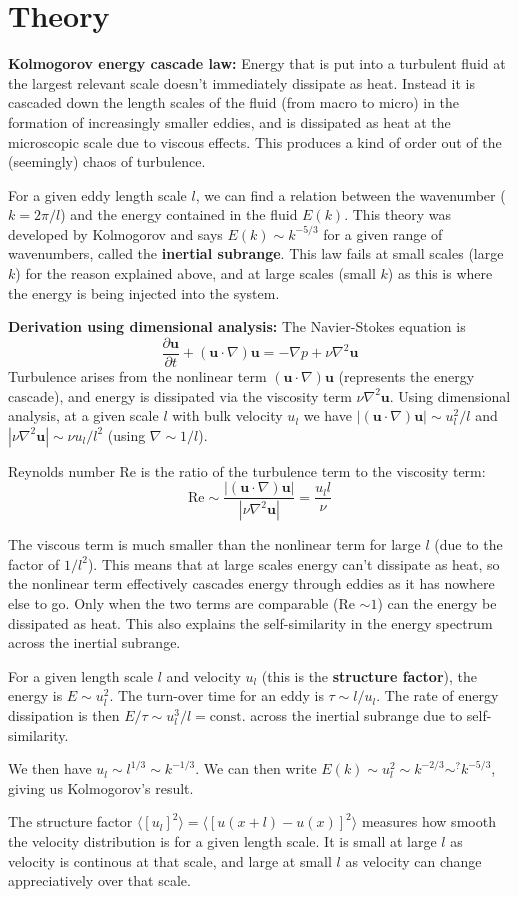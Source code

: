 \documentclass[12pt,letterpaper]{article}
\newcommand{\B}[1]{\mathbf{#1}}
\begin{document}
  \section*{Theory}
  \textbf{Kolmogorov energy cascade law: } Energy that is put into a turbulent fluid at the largest relevant scale doesn't immediately dissipate as heat. Instead it is cascaded down the length scales of the fluid (from macro to micro) in the formation of increasingly smaller eddies, and is dissipated as heat at the microscopic scale due to viscous effects. This produces a kind of order out of the (seemingly) chaos of turbulence.

  For a given eddy length scale $l$, we can find a relation between the wavenumber ($k=2\pi/l$) and the energy contained in the fluid $E(k)$. This theory was developed by Kolmogorov and says $E(k)\sim k^{-5/3}$ for a given range of wavenumbers, called the \textbf{inertial subrange}. This law fails at small scales (large $k$) for the reason explained above, and at large scales (small $k$) as this is where the energy is being injected into the system.

  \textbf{Derivation using dimensional analysis:} The Navier-Stokes equation is
  $$
    \frac{\partial \B{u}}{\partial t} + (\B{u}\cdot\nabla)\B{u} = -\nabla p + \nu \nabla^2\B{u}
  $$
  Turbulence arises from the nonlinear term $(\B{u}\cdot\nabla)\B{u}$ (represents the energy cascade), and energy is dissipated via the viscosity term $\nu \nabla^2\B{u}$. Using dimensional analysis, at a given scale $l$ with bulk velocity $u_l$ we have $|(\B{u}\cdot \nabla)\B{u}|\sim u^2_l/l$ and $|\nu \nabla^2 \B{u}|\sim \nu u_l / l^2$ (using $\nabla \sim 1/l$).

  Reynolds number Re is the ratio of the turbulence term to the viscosity term:
  $$
    \text{Re} \sim \frac{|(\B{u}\cdot \nabla)\B{u}|}{|\nu \nabla^2 \B{u}|} = \frac{u_l l}{\nu}
  $$

  The viscous term is much smaller than the nonlinear term for large $l$ (due to the factor of $1/l^2$). This means that at large scales energy can't dissipate as heat, so the nonlinear term effectively cascades energy through eddies as it has nowhere else to go. Only when the two terms are comparable (Re $\sim 1$) can the energy be dissipated as heat. This also explains the self-similarity in the energy spectrum across the inertial subrange.

  For a given length scale $l$ and velocity $u_l$ (this is the \textbf{structure factor}), the energy is $E\sim u^2_l$. The turn-over time for an eddy is $\tau\sim l/u_l$. The rate of energy dissipation is then $E/\tau \sim u^3_l/l=\text{const.}$ across the inertial subrange due to self-similarity.

  We then have $u_l\sim l^{1/3}\sim k^{-1/3}$. We can then write $E(k)\sim u^2_l \sim k^{-2/3} \sim^? k^{-5/3}$, giving us Kolmogorov's result.

  The structure factor $\langle[u_l]^2 \rangle = \langle [u(x+l)-u(x)]^2\rangle$ measures how smooth the velocity distribution is for a given length scale. It is small at large $l$ as velocity is continous at that scale, and large at small $l$ as velocity can change appreciatively over that scale.
\end{document}
